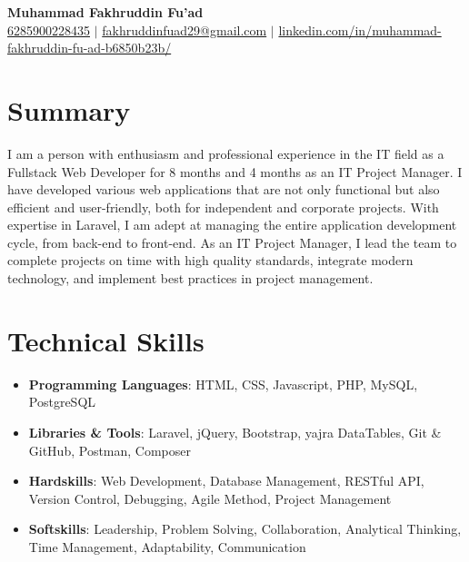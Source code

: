 \documentclass[letterpaper,10pt]{article}
\newcommand{\resumeItem}[1]{\item\small{#1}}
\newcommand{\resumeSubHeadingList}{\begin{itemize}[leftmargin=0.15in, label={}]}
\newcommand{\resumeSubHeadingListEnd}{\end{itemize}}
\begin{document}
\begin{center}
  \textbf{\Huge Muhammad Fakhruddin Fu'ad} \\
  \href{tel:+6285900228435}{6285900228435} $|$ 
  \href{mailto:fakhruddinfuad29@gmail.com}{fakhruddinfuad29@gmail.com} $|$ 
  \href{https://www.linkedin.com/in/muhammad-fakhruddin-fu-ad-b6850b23b/}{linkedin.com/in/muhammad-fakhruddin-fu-ad-b6850b23b/}
\end{center}

\section*{Summary}
I am a person with enthusiasm and professional experience in the IT field as a Fullstack Web Developer for 8 months and 4 months as an IT Project Manager. I have developed various web applications that are not only functional but also efficient and user-friendly, both for independent and corporate projects. With expertise in Laravel, I am adept at managing the entire application development cycle, from back-end to front-end. As an IT Project Manager, I lead the team to complete projects on time with high quality standards, integrate modern technology, and implement best practices in project management.

\section{Technical Skills}
\resumeSubHeadingList
  \resumeItem{\textbf{Programming Languages}: HTML, CSS, Javascript, PHP, MySQL, PostgreSQL}
  \resumeItem{\textbf{Libraries \& Tools}: Laravel, jQuery, Bootstrap, yajra DataTables, Git \& GitHub, Postman, Composer}
  \resumeItem{\textbf{Hardskills}: Web Development, Database Management, RESTful API, Version Control, Debugging, Agile Method, Project Management}
  \resumeItem{\textbf{Softskills}: Leadership, Problem Solving, Collaboration, Analytical Thinking, Time Management, Adaptability, Communication}
\resumeSubHeadingListEnd
\end{document}

